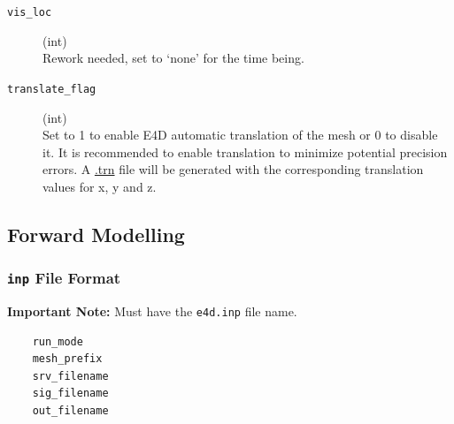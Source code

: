 \documentclass[a4paper,12pt]{article}
\begin{document}
\begin{description}
    \item[\texttt{vis\_loc}] (int)\hfill \\
    Rework needed, set to `none' for the time being.

    \item[\texttt{translate\_flag}] (int)\hfill \\
    Set to 1 to enable E4D automatic translation of the mesh or 0 to disable it. It is recommended to enable translation to minimize potential precision errors. A \hyperref[mesh_trn]{.trn} file will be generated with the corresponding translation values for x, y and z.
\end{description}






\newpage
\subsection{Forward Modelling}

\subsubsection{\texttt{inp} File Format} \label{forward_inp}

\begin{framed}
\noindent \textbf{Important Note:} Must have the \texttt{e4d.inp} file name.
\end{framed}

\begin{framed}
\begin{verbatim}
    run_mode
    mesh_prefix
    srv_filename
    sig_filename
    out_filename
\end{verbatim}
\end{framed}
\end{document}
